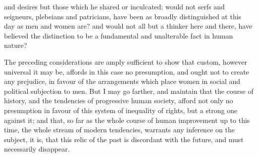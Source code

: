 \documentclass[12pt]{report}
\begin{document}
and desires but those which he shared or inculcated; would not serfs and seigneurs, plebeians and patricians, have been as broadly distinguished at this day as men and women are? and would not all but a thinker here and there, have believed the distinction to be a fundamental and unalterable fact in human nature?

The preceding considerations are amply sufficient to show that custom, however universal it may be, affords in this case no presumption, and ought not to create any prejudice, in favour of the arrangements which place women in social and political subjection to men. But I may go farther, and maintain that the course of history, and the tendencies of progressive human society, afford not only no presumption in favour of this system of inequality of rights, but a strong one against it; and that, so far as the whole course of human improvement up to this time, the whole stream of modern tendencies, warrants any inference on the subject, it is, that this relic of the past is discordant with the future, and must necessarily disappear.
\end{document}
